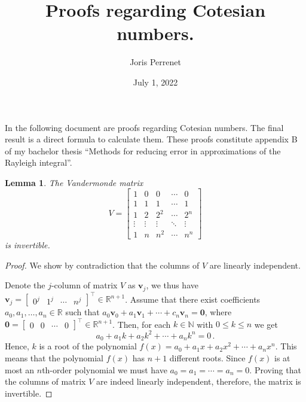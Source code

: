 \documentclass{article}
\title{Proofs regarding Cotesian numbers.}
\author{Joris Perrenet}
\date{July 1, 2022}
\newtheorem{lemma}[theorem]{Lemma}
\begin{document}
\maketitle

In the following document are proofs regarding Cotesian numbers.
The final result is a direct formula to calculate them.
These proofs constitute appendix B of my bachelor thesis ``Methods for reducing error in approximations of the Rayleigh integral''.

\begin{lemma}
\label{lemma:invertible}
The Vandermonde matrix
\begin{equation}
    V =
    \begin{bmatrix}
        1&0&0&\cdots&0 \\
        1&1&1&\cdots&1 \\
        1&2&2^2&\cdots&2^n \\
        \vdots&\vdots & \vdots & \ddots & \vdots\\
        1&n&n^2&\cdots&n^n
    \end{bmatrix} \nonumber
\end{equation}
is invertible.
\end{lemma}
\begin{proof}
We show by contradiction that the columns of $V$ are linearly independent.

Denote the $j$-column of matrix $V$ as $\mathbf v_j$, we thus have $\mathbf v_j = \begin{bmatrix} 0^j & 1^j & \cdots & n^j \end{bmatrix}^\top \in \mathbb R^{n+1}$.
Assume that there exist coefficients $a_0, a_1, \dots, a_n \in \mathbb R$ such that $a_0 \mathbf v_0 + a_1 \mathbf v_1 + \cdots + c_n \mathbf v_n = \mathbf 0$, where $\mathbf 0 = \begin{bmatrix} 0 & 0 & \cdots & 0 \end{bmatrix}^\top \in \mathbb R^{n+1}$.
Then, for each $k\in \mathbb N$ with $0 \leq k \leq n$ we get
\begin{equation}
    a_0 + a_1 k + a_2 k^2 + \cdots + a_n k^n = 0 \,.\nonumber
\end{equation}
Hence, $k$ is a root of the polynomial $f(x) = a_0 + a_1 x + a_2 x^2 + \cdots + a_n x^n$.
This means that the polynomial $f(x)$ has $n+1$ different roots.
Since $f(x)$ is at most an $n$th-order polynomial we must have $a_0 = a_1 = \cdots = a_n = 0$.
Proving that the columns of matrix $V$ are indeed linearly independent, therefore, the matrix is invertible.
\end{proof}
\end{document}
